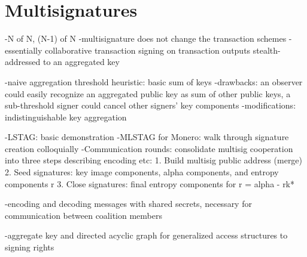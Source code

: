\chapter{Multisignatures}
\label{chapter:multisignatures}

-N of N, (N-1) of N
-multisignature does not change the transaction schemes
-essentially collaborative transaction signing on transaction outputs stealth-addressed to an aggregated key

-naive aggregation threshold heuristic: basic sum of keys
    -drawbacks: an observer could easily recognize an aggregated public key as sum of other public keys, a sub-threshold signer could cancel other signers' key components
    -modifications: indistinguishable key aggregation

-LSTAG: basic demonstration
-MLSTAG for Monero: walk through signature creation colloquially
-Communication rounds: consolidate multisig cooperation into three steps describing encoding etc:
    1. Build multisig public address (merge)
    2. Seed signatures: key image components, alpha components, and entropy components r
    3. Close signatures: final entropy components for r = alpha - rk*
    
-encoding and decoding messages with shared secrets, necessary for communication between coalition members

-aggregate key and directed acyclic graph for generalized access structures to signing rights